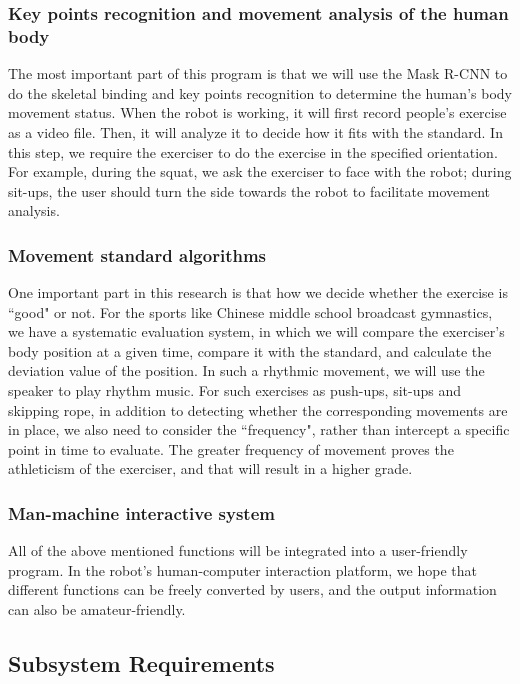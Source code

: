 \subsubsection{Key points recognition and movement analysis of the human body}
The most important part of this program is that we will use the Mask R-CNN to do the skeletal binding and key points recognition to determine the human’s body movement status. When the robot is working, it will first record people's exercise as a video file. Then, it will analyze it to decide how it fits with the standard. In this step, we require the exerciser to do the exercise in the specified orientation. For example, during the squat, we ask the exerciser to face with the robot; during sit-ups, the user should turn the side towards the robot to facilitate movement analysis. 
\subsubsection{Movement standard algorithms}
One important part in this research is that how we decide whether the exercise is ``good" or not. For the sports like Chinese middle school broadcast gymnastics, we have a systematic evaluation system, in which we will compare the exerciser's body position at a given time, compare it with the standard, and calculate the deviation value of the position. In such a rhythmic movement, we will use the speaker to play rhythm music. For such exercises as push-ups, sit-ups and skipping rope, in addition to detecting whether the corresponding movements are in place, we also need to consider the ``frequency", rather than intercept a specific point in time to evaluate. The greater frequency of movement proves the athleticism of the exerciser, and that will result in a higher grade. 
\subsubsection{Man-machine interactive system}
All of the above mentioned functions will be integrated into a user-friendly program. In the robot's human-computer interaction platform, we hope that different functions can be freely converted by users, and the output information can also be amateur-friendly.


\newpage
\subsection{Subsystem Requirements}
